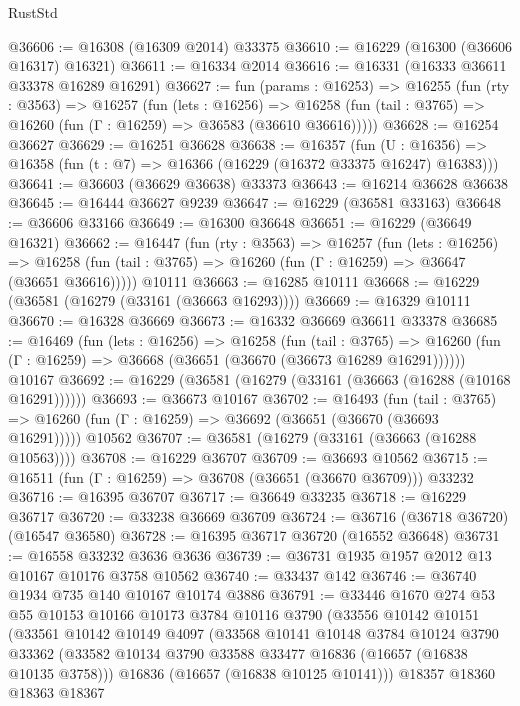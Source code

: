 \begin{lexlean}{RustStd}
\begin{coremodule}
@36606 := @16308 (@16309 @2014) @33375
@36610 := @16229 (@16300 (@36606 @16317) @16321)
@36611 := @16334 @2014
@36616 := @16331 (@16333 @36611 @33378 @16289 @16291)
@36627 := fun (params : @16253) =>
  @16255
    (fun (rty : @3563) =>
    @16257
      (fun (lets : @16256) =>
      @16258 (fun (tail : @3765) => @16260 (fun (Γ : @16259) => @36583 (@36610 @36616)))))
@36628 := @16254 @36627
@36629 := @16251 @36628
@36638 := @16357
    (fun (U : @16356) => @16358 (fun (t : @7) => @16366 (@16229 (@16372 @33375 @16247) @16383)))
@36641 := @36603 (@36629 @36638) @33373
@36643 := @16214 @36628 @36638
@36645 := @16444 @36627 @9239
@36647 := @16229 (@36581 @33163)
@36648 := @36606 @33166
@36649 := @16300 @36648
@36651 := @16229 (@36649 @16321)
@36662 := @16447
    (fun (rty : @3563) =>
    @16257
      (fun (lets : @16256) =>
      @16258 (fun (tail : @3765) => @16260 (fun (Γ : @16259) => @36647 (@36651 @36616)))))
    @10111
@36663 := @16285 @10111
@36668 := @16229 (@36581 (@16279 (@33161 (@36663 @16293))))
@36669 := @16329 @10111
@36670 := @16328 @36669
@36673 := @16332 @36669 @36611 @33378
@36685 := @16469
    (fun (lets : @16256) =>
    @16258
      (fun (tail : @3765) =>
      @16260 (fun (Γ : @16259) => @36668 (@36651 (@36670 (@36673 @16289 @16291))))))
    @10167
@36692 := @16229 (@36581 (@16279 (@33161 (@36663 (@16288 (@10168 @16291))))))
@36693 := @36673 @10167
@36702 := @16493
    (fun (tail : @3765) => @16260 (fun (Γ : @16259) => @36692 (@36651 (@36670 (@36693 @16291)))))
    @10562
@36707 := @36581 (@16279 (@33161 (@36663 (@16288 @10563))))
@36708 := @16229 @36707
@36709 := @36693 @10562
@36715 := @16511 (fun (Γ : @16259) => @36708 (@36651 (@36670 @36709))) @33232
@36716 := @16395 @36707
@36717 := @36649 @33235
@36718 := @16229 @36717
@36720 := @33238 @36669 @36709
@36724 := @36716 (@36718 @36720) (@16547 @36580)
@36728 := @16395 @36717 @36720 (@16552 @36648)
@36731 := @16558 @33232 @3636 @3636
@36739 := @36731 @1935 @1957 @2012 @13 @10167 @10176 @3758 @10562
@36740 := @33437 @142
@36746 := @36740 @1934 @735 @140 @10167 @10174 @3886
@36791 := @33446
    @1670
    @274
    @53
    @55
    @10153
    @10166
    @10173
    @3784
    @10116
    @3790
    (@33556
      @10142
      @10151
      (@33561
        @10142
        @10149
        @4097
        (@33568
          @10141
          @10148
          @3784
          @10124
          @3790
          @33362
          (@33582 @10134 @3790 @33588 @33477 @16836 (@16657 (@16838 @10135 @3758)))
          @16836
          (@16657 (@16838 @10125 @10141)))
        @18357
        @18360
        @18363
        @18367

\end{coremodule}
\end{lexlean}
